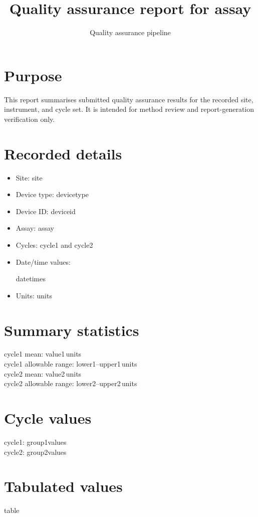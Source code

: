 \documentclass{article}
\title{Quality assurance report for {{assay}}}
\author{Quality assurance pipeline}
\date{}
\begin{document}
\maketitle

\section*{Purpose}
This report summarises submitted quality assurance results for the recorded site, instrument, and cycle set. It is intended for method review and report-generation verification only.

\section*{Recorded details}
\begin{itemize}
  \item Site: {{site}}
  \item Device type: {{devicetype}}
  \item Device ID: {{deviceid}}
  \item Assay: {{assay}}
  \item Cycles: {{cycle1}} and {{cycle2}}
  \item Date/time values:
  \begin{itemize}
{{datetimes}}
  \end{itemize}
  \item Units: {{units}}
\end{itemize}

\section*{Summary statistics}
{{cycle1}} mean: {{value1}}\,{{units}}\\
{{cycle1}} allowable range: {{lower1}}--{{upper1}}\,{{units}}\\
{{cycle2}} mean: {{value2}}\,{{units}}\\
{{cycle2}} allowable range: {{lower2}}--{{upper2}}\,{{units}}

\section*{Cycle values}
{{cycle1}}: {{group1values}}\\
{{cycle2}}: {{group2values}}

\section*{Tabulated values}
{{table}}
\end{document}

